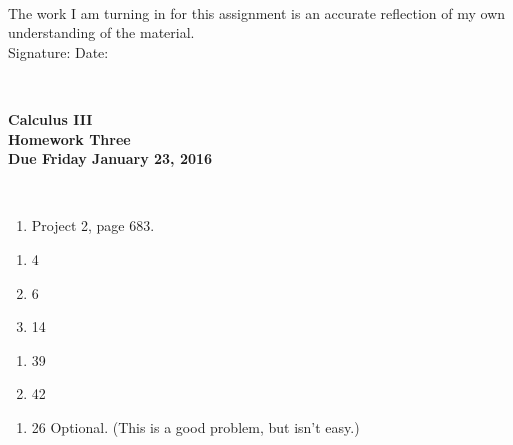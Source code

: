 \documentclass[12pt]{article}
\begin{document}
\\

\bigskip
\bigskip
\bigskip
\bigskip
\bigskip
\bigskip
\noindent The work I am turning in for this assignment is an accurate
reflection of my own understanding of the material.\\[14pt]

\noindent Signature: \underline{\hspace{7cm}} \hspace{1cm} Date:
\underline{\hspace{5cm}} 


\hspace{2mm}\\
\newpage

 
\begin{center}
{\large {\bf Calculus III}}\\
\medskip
{\large {\bf Homework Three}}\\
\medskip
{ {\bf Due Friday January 23, 2016}}\\
\end{center}

\hspace{2mm}\\

\begin{enumerate}
  \item Project 2, page 683.
\end{enumerate}

\begin{enumerate}
\setlength{\itemsep}{-1mm}
  \item 4
  \item 6
  \item 14
\end{enumerate}

\begin{enumerate}
\setlength{\itemsep}{-1mm}
  \item 39
  \item 42
\end{enumerate}

\begin{enumerate}
\setlength{\itemsep}{-1mm}
  \item 26 Optional.  (This is a good problem, but isn't easy.)
\end{enumerate}
\end{document}
